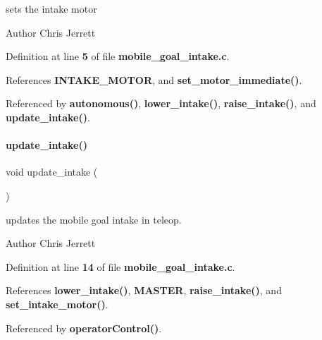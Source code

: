 sets the intake motor 

\begin{DoxyAuthor}{Author}
Chris Jerrett 
\end{DoxyAuthor}


Definition at line \textbf{ 5} of file \textbf{ mobile\+\_\+goal\+\_\+intake.\+c}.



References \textbf{ I\+N\+T\+A\+K\+E\+\_\+\+M\+O\+T\+OR}, and \textbf{ set\+\_\+motor\+\_\+immediate()}.



Referenced by \textbf{ autonomous()}, \textbf{ lower\+\_\+intake()}, \textbf{ raise\+\_\+intake()}, and \textbf{ update\+\_\+intake()}.

\mbox{\label{mobile__goal__intake_8h_a5d7bad8a208988af743fd2e68f111286}} 
\paragraph{update\+\_\+intake()}
{\footnotesize\ttfamily void update\+\_\+intake (\begin{DoxyParamCaption}{ }\end{DoxyParamCaption})}



updates the mobile goal intake in teleop. 

\begin{DoxyAuthor}{Author}
Chris Jerrett 
\end{DoxyAuthor}


Definition at line \textbf{ 14} of file \textbf{ mobile\+\_\+goal\+\_\+intake.\+c}.



References \textbf{ lower\+\_\+intake()}, \textbf{ M\+A\+S\+T\+ER}, \textbf{ raise\+\_\+intake()}, and \textbf{ set\+\_\+intake\+\_\+motor()}.



Referenced by \textbf{ operator\+Control()}.

